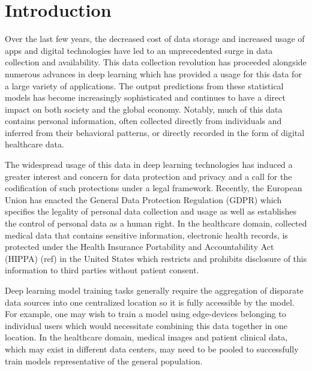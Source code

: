 \documentclass[twocolumn, switch]{article} %
\begin{document}

\section{Introduction}

Over the last few years, the decreased cost of data storage and increased usage of apps and digital technologies have led to an unprecedented surge in data collection and availability. This data collection revolution has proceeded alongside numerous advances in deep learning which has provided a usage for this data for a large variety of applications. The output predictions from these statistical models has become increasingly sophisticated and continues to have a direct impact on both society and the global economy. Notably, much of this data contains personal information, often collected directly from individuals and inferred from their behavioral patterns, or directly recorded in the form of digital healthcare data.

The widespread usage of this data in deep learning technologies has induced a greater interest and concern for data protection and privacy and a call for the codification of such protections under a legal framework. Recently, the European Union has enacted the General Data Protection Regulation (GDPR) \cite{gdpr, gpdr_url} which specifies the legality of personal data collection and usage as well as establishes the control of personal data as a human right. In the healthcare domain, collected medical data that contains sensitive information, electronic health records, is protected under the Health Insurance Portability and Accountability Act (HIPPA) (ref) in the United States which restricts and prohibits disclosure of this information to third parties without patient consent. 

Deep learning model training tasks generally require the aggregation of disparate data sources into one centralized location so it is fully accessible by the model. For example, one may wish to train a model using edge-devices belonging to individual users which would necessitate combining this data together in one location. In the healthcare domain, medical images and patient clinical data, which may exist in different data centers, may need to be pooled to successfully train models representative of the general population. 
\end{document}
